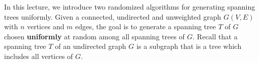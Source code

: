 \documentclass[11pt]{article}
\begin{document}
\newcommand{\coursenum}{{CSC 2240H}}
\newcommand{\coursename}{{Graphs, Matrices, and Optimization}}
\newcommand{\courseprof}{Sushant Sachdeva}


In this lecture, we introduce two randomized algorithms for generating spanning trees uniformly. Given a connected, undirected and unweighted graph
$G(V, E)$ with $n$ vertices and $m$ edges, the goal is to generate a spanning tree $T$ of $G$ chosen \textbf{uniformly} at random among all spanning trees of $G$. Recall that a spanning tree $T$ of an undirected graph $G$ is a subgraph that is a tree which includes all vertices of $G$.




% 
% 

\printbibliography
\end{document}

